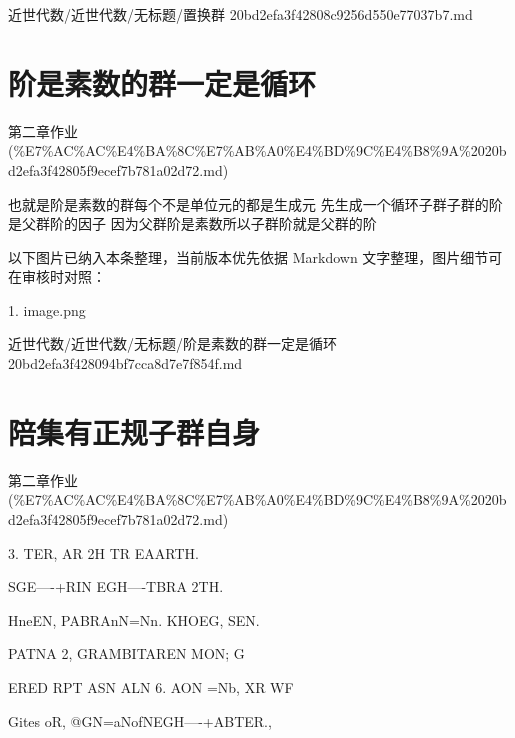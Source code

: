 \begin{note}[来源路径]

近世代数/近世代数/无标题/置换群 20bd2efa3f42808c9256d550e77037b7.md

\end{note}

\section*{阶是素数的群一定是循环}

\begin{note}[来源上级主题]

第二章作业 (\%E7\%AC\%AC\%E4\%BA\%8C\%E7\%AB\%A0\%E4\%BD\%9C\%E4\%B8\%9A\%2020bd2efa3f42805f9ecef7b781a02d72.md)

\end{note}

\begin{homework}

也就是阶是素数的群每个不是单位元的都是生成元 先生成一个循环子群子群的阶是父群阶的因子 因为父群阶是素数所以子群阶就是父群的阶

\end{homework}

\begin{note}[关联图片]
以下图片已纳入本条整理，当前版本优先依据 Markdown 文字整理，图片细节可在审核时对照：

1. image.png\\

\end{note}

\begin{note}[来源路径]

近世代数/近世代数/无标题/阶是素数的群一定是循环 20bd2efa3f428094bf7cca8d7e7f854f.md

\end{note}

\section*{陪集有正规子群自身}

\begin{note}[来源上级主题]

第二章作业 (\%E7\%AC\%AC\%E4\%BA\%8C\%E7\%AB\%A0\%E4\%BD\%9C\%E4\%B8\%9A\%2020bd2efa3f42805f9ecef7b781a02d72.md)

\end{note}

\begin{homework}

3. TER, AR 2H TR EAARTH.

SGE—-+RIN EGH—-TBRA 2TH.

HneEN, PABRAnN=Nn. KHOEG, SEN.

PATNA 2, GRAMBITAREN MON; G

ERED RPT ASN ALN 6. AON =Nb, XR WF

Gites oR, @GN=aNofNEGH—-+ABTER.,

\end{homework}

